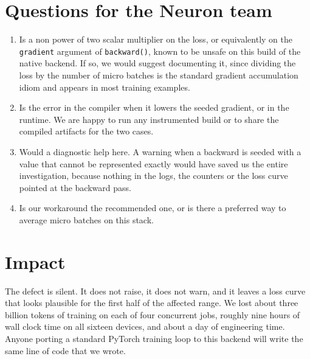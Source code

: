 \documentclass[11pt,a4paper]{article}
\newcommand{\code}[1]{\texttt{\small #1}}
\begin{document}
\section{Questions for the Neuron team}

\begin{enumerate}
\item Is a non power of two scalar multiplier on the loss, or equivalently on the
      \code{gradient} argument of \code{backward()}, known to be unsafe on this
      build of the native backend. If so, we would suggest documenting it, since
      dividing the loss by the number of micro batches is the standard gradient
      accumulation idiom and appears in most training examples.
\item Is the error in the compiler when it lowers the seeded gradient, or in the
      runtime. We are happy to run any instrumented build or to share the compiled
      artifacts for the two cases.
\item Would a diagnostic help here. A warning when a backward is seeded with a
      value that cannot be represented exactly would have saved us the entire
      investigation, because nothing in the logs, the counters or the loss curve
      pointed at the backward pass.
\item Is our workaround the recommended one, or is there a preferred way to
      average micro batches on this stack.
\end{enumerate}

\section{Impact}

The defect is silent. It does not raise, it does not warn, and it leaves a loss
curve that looks plausible for the first half of the affected range. We lost about
three billion tokens of training on each of four concurrent jobs, roughly nine
hours of wall clock time on all sixteen devices, and about a day of engineering
time. Anyone porting a standard PyTorch training loop to this backend will write
the same line of code that we wrote.
\end{document}
